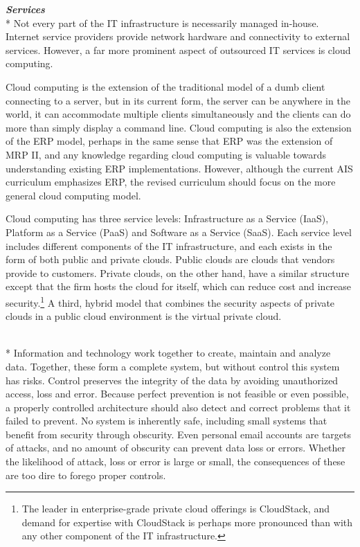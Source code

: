 \documentclass[12pt]{article}
\newcommand{\SubSection}[1]{\vspace{.15in}{\centering{}\normalsize{}\textbf{#1}}\\*\indent{}}
\newcommand{\SubSubSection}[1]{{\centering{}\normalsize{}\textbf{\emph{#1}}}\\*\indent{}}
\begin{document}
\SubSubSection{Services}
Not every part of the IT infrastructure is necessarily managed in-house. Internet service providers provide network hardware and connectivity to external services. However, a far more prominent aspect of outsourced IT services is cloud computing.

Cloud computing is the extension of the traditional model of a dumb client connecting to a server, but in its current form, the server can be anywhere in the world, it can accommodate multiple clients simultaneously and the clients can do more than simply display a command line. Cloud computing is also the extension of the ERP model, perhaps in the same sense that ERP was the extension of MRP II, and any knowledge regarding cloud computing is valuable towards understanding existing ERP implementations. However, although the current AIS curriculum emphasizes ERP, the revised curriculum should focus on the more general cloud computing model.

Cloud computing has three service levels: Infrastructure as a Service (IaaS), Platform as a Service (PaaS) and Software as a Service (SaaS). Each service level includes different components of the IT infrastructure, and each exists in the form of both public and private clouds. Public clouds are clouds that vendors provide to customers. Private clouds, on the other hand, have a similar structure except that the firm hosts the cloud for itself, which can reduce cost and increase security.\footnote{The leader in enterprise-grade private cloud offerings is CloudStack, and demand for expertise with CloudStack is perhaps more pronounced than with any other component of the IT infrastructure.} A third, hybrid model that combines the security aspects of private clouds in a public cloud environment is the virtual private cloud.

\SubSection{Control}
Information and technology work together to create, maintain and analyze data. Together, these form a complete system, but without control this system has risks. Control preserves the integrity of the data by avoiding unauthorized access, loss and error. Because perfect prevention is not feasible or even possible, a properly controlled architecture should also detect and correct problems that it failed to prevent. No system is inherently safe, including small systems that benefit from security through obscurity. Even personal email accounts are targets of attacks, and no amount of obscurity can prevent data loss or errors. Whether the likelihood of attack, loss or error is large or small, the consequences of these are too dire to forego proper controls.
\end{document}
